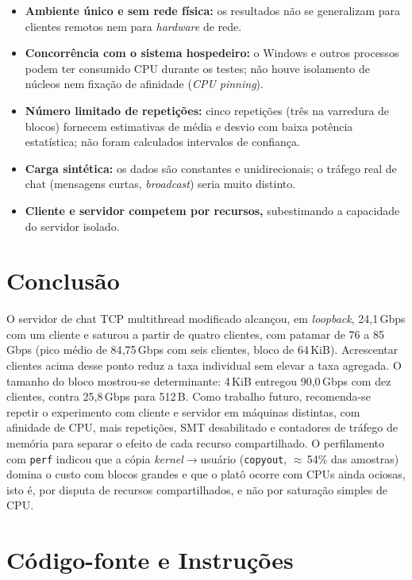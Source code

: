 \documentclass[12pt,a4paper]{article}
\newcommand{\SI}[2]{\mbox{#1\,#2}}
\begin{document}
\begin{itemize}
  \item \textbf{Ambiente único e sem rede física:} os resultados não se
  generalizam para clientes remotos nem para \textit{hardware} de rede.
  \item \textbf{Concorrência com o sistema hospedeiro:} o Windows e outros
  processos podem ter consumido CPU durante os testes; não houve isolamento
  de núcleos nem fixação de afinidade (\textit{CPU pinning}).
  \item \textbf{Número limitado de repetições:} cinco repetições (três na
  varredura de blocos) fornecem estimativas de média e desvio com baixa
  potência estatística; não foram calculados intervalos de confiança.
  \item \textbf{Carga sintética:} os dados são constantes e unidirecionais; o
  tráfego real de chat (mensagens curtas, \textit{broadcast}) seria muito
  distinto.
  \item \textbf{Cliente e servidor competem por recursos,} subestimando a
  capacidade do servidor isolado.
\end{itemize}

\section{Conclusão}

O servidor de chat TCP multithread modificado alcançou, em \textit{loopback},
\SI{24{,}1}{Gbps} com um cliente e saturou a partir de quatro clientes, com
patamar de 76 a \SI{85}{Gbps} (pico médio de \SI{84{,}75}{Gbps} com seis
clientes, bloco de \SI{64}{KiB}). Acrescentar clientes acima desse ponto reduz
a taxa individual sem elevar a taxa agregada. O tamanho do bloco mostrou-se
determinante: \SI{4}{KiB} entregou \SI{90{,}0}{Gbps} com dez clientes, contra
\SI{25{,}8}{Gbps} para \SI{512}{B}. Como trabalho futuro, recomenda-se repetir
o experimento com cliente e servidor em máquinas distintas, com afinidade de
CPU, mais repetições, SMT desabilitado e contadores de tráfego de memória
para separar o efeito de cada recurso compartilhado. O perfilamento com
\texttt{perf} indicou que a cópia \textit{kernel}$\to$usuário
(\texttt{copyout}, $\approx$\,54\% das amostras) domina o custo com blocos
grandes e que o platô ocorre com CPUs ainda ociosas, isto é, por disputa de
recursos compartilhados, e não por saturação simples de CPU.

\section*{Código-fonte e Instruções}
\end{document}
